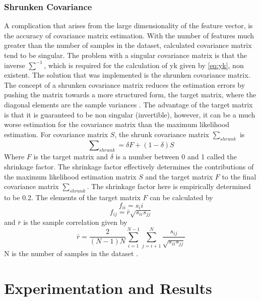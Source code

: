 \documentclass[12pt, a4paper, fleqn]{memoir}%
\begin{document}
\subsection{Shrunken Covariance}
A complication that arises from the large dimensionality of the feature vector, is the accuracy of covariance matrix estimation. With the number of features much greater than the number of samples in the dataset, calculated covariance matrix tend to be singular. The problem with a singular covariance matrix is that the inverse $\sum\nolimits^{-1}$, which is required for the calculation of yk given by \ref{eq:yk}, non existent. The solution that was implemented is the shrunken covariance matrix. The concept of a shrunken covariance matrix reduces the estimation errors by pushing the matrix towards a more structured form, the target matrix, where the diagonal elements are the sample variances \cite{disatnik2007shrinking}. The advantage of the target matrix is that it is guaranteed to be non singular (invertible), however, it can be a much worse estimation for the covariance matrix than the maximum likelihood estimation. For covariance matrix $S$, the shrunk covariance matrix $\sum\nolimits_{shrunk}$ is
\begin{equation}
	\label{eq:shrunkcov}
	\sum\nolimits_{shrunk} = \delta F + (1 - \delta)S
\end{equation}
Where $F$ is the target matrix and $\delta$ is a number between 0 and 1 called the shrinkage factor. The shrinkage factor effectively determines the contributions of the maximum likelihood estimation matrix $S$ and the target matrix $F$ to the final covariance matrix $\sum\nolimits_{shrunk}$. The shrinkage factor here is empirically determined to be 0.2. The elements of the target matrix $F$ can be calculated by 
\begin{equation}
	\label{eq:f}
	f_{ii} = s_ii
\end{equation}
\begin{equation}
	f_{ij} = \bar{r}\sqrt{s_{ii}s_{jj}}
\end{equation}
and $\bar{r}$ is the sample correlation given by
\begin{equation}
	\label{rbar}
	\bar{r} = \frac{2}{(N - 1)N}\sum^{N-1}_{i=1}\sum^{N}_{j=i+1}\frac{s_{ij}}{\sqrt{s_{ii}s_{jj}}}
\end{equation}
N is the number of samples in the dataset \cite{ledoit2004honey}.

\chapter{Experimentation and Results}
\label{chap:results}
\end{document}
